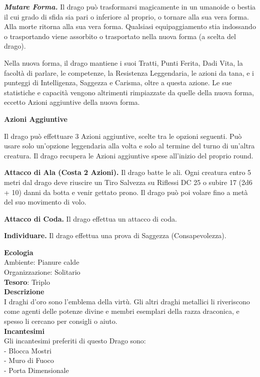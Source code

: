\begin{multicols}{2}
\textit{\textbf{Mutare Forma.}} Il drago può trasformarsi magicamente in un umanoide o bestia il cui grado di sfida sia pari o inferiore al proprio, o tornare alla sua vera forma. Alla morte ritorna alla sua vera forma. Qualsiasi equipaggiamento stia indossando o trasportando viene assorbito o trasportato nella nuova forma (a scelta del drago).

Nella nuova forma, il drago mantiene i suoi Tratti, Punti Ferita, Dadi Vita, la facoltà di parlare, le competenze, la Resistenza Leggendaria, le azioni da tana, e i punteggi di Intelligenza, Saggezza e Carisma, oltre a questa azione. Le sue statistiche e capacità vengono altrimenti rimpiazzate da quelle della nuova forma, eccetto Azioni aggiuntive della nuova forma.

\textbf{Azioni Aggiuntive}

Il drago può effettuare 3 Azioni aggiuntive, scelte tra le opzioni seguenti. Può usare solo un'opzione leggendaria alla volta e solo al termine del turno di un'altra creatura. Il drago recupera le Azioni aggiuntive spese all'inizio del proprio round.

\textbf{Attacco di Ala (Costa 2 Azioni).} Il drago batte le ali. Ogni creatura entro 5 metri dal drago deve riuscire un Tiro Salvezza su Riflessi DC 25 o subire 17 (2d6 + 10) danni da botta e venir gettato prono. Il drago può poi volare fino a metà del suo movimento di volo.

\textbf{Attacco di Coda.} Il drago effettua un attacco di coda.

\textbf{Individuare.} Il drago effettua una prova di Saggezza (Consapevolezza).

\textbf{Ecologia}\\
Ambiente: Pianure calde\\
Organizzazione: Solitario\\
\textbf{Tesoro}: Triplo\\
\textbf{Descrizione}\\
I draghi d'oro sono l'emblema della virtù. Gli altri draghi metallici li riveriscono come agenti delle potenze divine e membri esemplari della razza draconica, e spesso li cercano per consigli o aiuto.\\
\textbf{Incantesimi}\\
Gli incantesimi preferiti di questo Drago sono:\\
- Blocca Mostri\\
- Muro di Fuoco\\
- Porta Dimensionale


\end{multicols}
